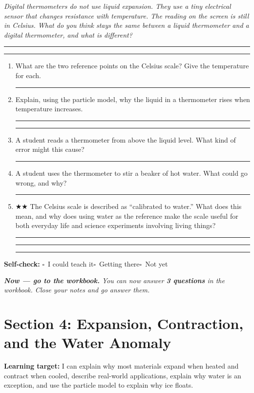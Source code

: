 \documentclass[11pt, a4paper]{article}
\newcommand{\answerline}{\par\vspace{0.45cm}\noindent\rule{\linewidth}{0.4pt}\par\vspace{0.1cm}}
\newcommand{\selfcheck}{\par\smallskip\noindent\textbf{Self-check:}
  $\square$~I could teach it\quad$\square$~Getting there\quad$\square$~Not yet\smallskip}
\begin{document}
\begin{tcolorbox}[connection]
\small\textit{Digital thermometers do not use liquid expansion. They use a tiny electrical sensor that changes resistance with temperature. The reading on the screen is still in Celsius. What do you think stays the same between a liquid thermometer and a digital thermometer, and what is different?}
\answerline\answerline
\end{tcolorbox}

\begin{tcolorbox}[retrieval]
\begin{enumerate}
  \item What are the two reference points on the Celsius scale? Give the temperature for each.
  \answerline

  \item Explain, using the particle model, why the liquid in a thermometer rises when temperature increases.
  \answerline\answerline

  \item A student reads a thermometer from above the liquid level. What kind of error might this cause?
  \answerline

  \item A student uses the thermometer to stir a beaker of hot water. What could go wrong, and why?
  \answerline

  \item $\bigstar\bigstar$ The Celsius scale is described as ``calibrated to water.'' What does this mean, and why does using water as the reference make the scale useful for both everyday life and science experiments involving living things?
  \answerline\answerline\answerline
\end{enumerate}
\end{tcolorbox}

\selfcheck

\smallskip
\noindent\textit{\textbf{Now --- go to the workbook.} You can now answer \textbf{3 questions} in the workbook. Close your notes and go answer them.}

\clearpage

\section{Section 4: Expansion, Contraction, and the Water Anomaly}

\begin{tcolorbox}[learningtarget]
\textbf{Learning target:} I can explain why most materials expand when heated and contract when cooled, describe real-world applications, explain why water is an exception, and use the particle model to explain why ice floats.
\end{tcolorbox}
\end{document}
